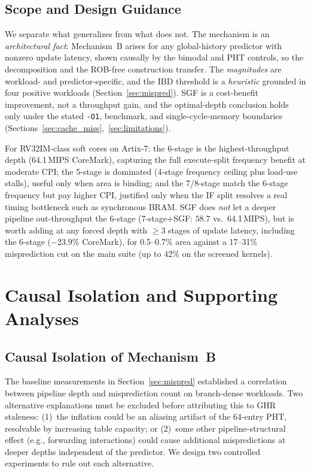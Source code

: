 \documentclass[acmsmall,nonacm,screen]{acmart}
\begin{document}
\subsection{Scope and Design Guidance}
\label{sec:guidance}

We separate what generalizes from what does not. The mechanism is an \emph{architectural fact}: Mechanism~B arises for any global-history predictor with nonzero update latency, shown causally by the bimodal and PHT controls, so the decomposition and the ROB-free construction transfer. The \emph{magnitudes} are workload- and predictor-specific, and the IBD threshold is a \emph{heuristic} grounded in four positive workloads (Section~\ref{sec:mispred}). SGF is a cost-benefit improvement, not a throughput gain, and the optimal-depth conclusion holds only under the stated \texttt{-O1}, benchmark, and single-cycle-memory boundaries (Sections~\ref{sec:cache_miss},~\ref{sec:limitations}).

For RV32IM-class soft cores on Artix-7: the 6-stage is the highest-throughput depth (64.1\,MIPS CoreMark), capturing the full execute-split frequency benefit at moderate CPI; the 5-stage is dominated (4-stage frequency ceiling plus load-use stalls), useful only when area is binding; and the 7/8-stage match the 6-stage frequency but pay higher CPI, justified only when the IF split resolves a real timing bottleneck such as synchronous BRAM. SGF does \emph{not} let a deeper pipeline out-throughput the 6-stage (7-stage+SGF: $58.7$ vs.\ 64.1\,MIPS), but is worth adding at any forced depth with $\geq$3 stages of update latency, including the 6-stage ($-$23.9\% CoreMark), for 0.5--0.7\% area against a 17--31\% misprediction cut on the main suite (up to 42\% on the screened kernels).

\section{Causal Isolation and Supporting Analyses}
\label{sec:supplementary}

\subsection{Causal Isolation of Mechanism~B}
\label{sec:causal}

The baseline measurements in Section~\ref{sec:mispred} established a correlation between pipeline depth and misprediction count on branch-dense workloads.
Two alternative explanations must be excluded before attributing this to GHR staleness: (1)~the inflation could be an aliasing artifact of the 64-entry PHT, resolvable by increasing table capacity; or (2)~some other pipeline-structural effect (e.g., forwarding interactions) could cause additional mispredictions at deeper depths independent of the predictor.
We design two controlled experiments to rule out each alternative.
\end{document}
